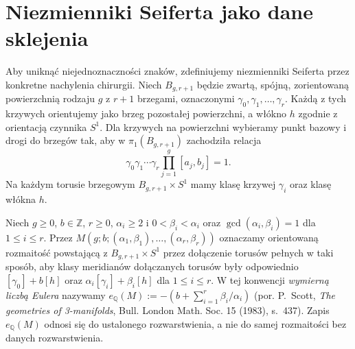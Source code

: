 \begin{center}
\end{center}

\section{Niezmienniki Seiferta jako dane sklejenia}
\label{sec:tg-seifert-gluing}

Aby uniknąć niejednoznaczności znaków, zdefiniujemy
niezmienniki Seiferta przez konkretne nachylenia chirurgii.
Niech $B_{g,r+1}$ będzie zwartą, spójną, zorientowaną
powierzchnią rodzaju $g$ z $r+1$ brzegami, oznaczonymi
$\gamma_0,\gamma_1,\ldots,\gamma_r$.
Każdą z tych krzywych orientujemy jako brzeg
pozostałej powierzchni, a włókno $h$ zgodnie
z orientacją czynnika $S^1$.
Dla krzywych na powierzchni wybieramy punkt bazowy i drogi
do brzegów tak, aby w $\pi_1(B_{g,r+1})$ zachodziła relacja
\[
\gamma_0\gamma_1\cdots\gamma_r
\prod_{j=1}^g[a_j,b_j]=1.
\]
Na każdym torusie brzegowym $B_{g,r+1}\times S^1$ mamy
klasę krzywej $\gamma_i$ oraz klasę włókna $h$.

\begin{definicja}
Niech $g\geq0$, $b\in\mathbb Z$, $r\geq0$,
$\alpha_i\geq2$ i $0<\beta_i<\alpha_i$ oraz
$\gcd(\alpha_i,\beta_i)=1$ dla $1\leq i\leq r$.
Przez
$M(g;b;(\alpha_1,\beta_1),\ldots,(\alpha_r,\beta_r))$
oznaczamy orientowaną rozmaitość powstającą z
$B_{g,r+1}\times S^1$ przez dołączenie torusów pełnych
w taki sposób, aby klasy meridianów dołączanych torusów
były odpowiednio
$[\gamma_0]+b[h]$ oraz
$\alpha_i[\gamma_i]+\beta_i[h]$ dla $1\leq i\leq r$.
W tej konwencji \emph{wymierną liczbą Eulera} nazywamy
$e_{\mathbb Q}(M):=-(b+\sum_{i=1}^r\beta_i/\alpha_i)$
(por. P.~Scott, \emph{The geometries of 3-manifolds},
Bull. London Math. Soc. 15 (1983), s.~437).
Zapis $e_{\mathbb Q}(M)$ odnosi się do ustalonego
rozwarstwienia, a nie do samej rozmaitości bez
danych rozwarstwienia.
\end{definicja}

